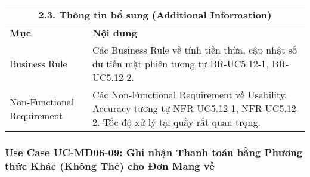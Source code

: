\begin{longtable}{|m{4cm}|p{11cm}|}
\hline
\multicolumn{2}{|c|}{\textbf{2.3. Thông tin bổ sung (Additional Information)}} \\
\hline
\textbf{Mục} & \textbf{Nội dung} \\
\hline
Business Rule & Các Business Rule về tính tiền thừa, cập nhật số dư tiền mặt phiên tương tự BR-UC5.12-1, BR-UC5.12-2. \\
\hline
Non-Functional Requirement & Các Non-Functional Requirement về Usability, Accuracy tương tự NFR-UC5.12-1, NFR-UC5.12-2. Tốc độ xử lý tại quầy rất quan trọng. \\
\hline
\end{longtable}

\subsubsection{Use Case UC-MD06-09: Ghi nhận Thanh toán bằng Phương thức Khác (Không Thẻ) cho Đơn Mang về}
